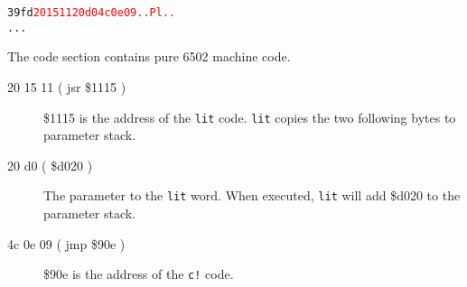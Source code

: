\begin{alltt}
39fd  \textcolor{red}{20 15 11 20 d0 4c 0e 09  .. Pl..}
...
\end{alltt}

The code section contains pure 6502 machine code.

\begin{description}
\item[20 15 11 ( jsr \$1115 )] \$1115 is the address of the \texttt{lit} code. \texttt{lit} copies the two following bytes to parameter stack.
\item[20 d0 ( \$d020 )] The parameter to the \texttt{lit} word. When executed, \texttt{lit} will add \$d020 to the parameter stack.
\item[4c 0e 09 ( jmp \$90e )] \$90e is the address of the \texttt{c!} code.
\end{description}
